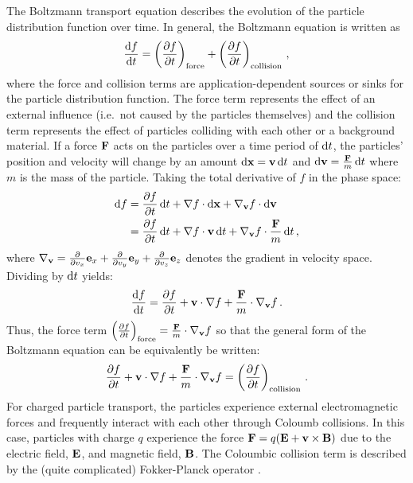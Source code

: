 \documentclass[../doc.tex]{subfiles}
\begin{document}
The Boltzmann transport equation describes the evolution of the particle distribution function over time. In general, the Boltzmann equation is written as 
	\begin{equation}
		\frac{\mathop{}\!\mathrm{d} f}{\mathop{}\!\mathrm{d} t} = \left( \frac{\partial f}{\partial t} \right)_\text{force} + \left( \frac{\partial f}{\partial t} \right)_\text{collision} \,,
	\end{equation}
where the force and collision terms are application-dependent sources or sinks for the particle distribution function. The force term represents the effect of an external influence (i.e.~not caused by the particles themselves) and the collision term represents the effect of particles colliding with each other or a background material. If a force $\boldsymbol{\mathrm{F}}$ acts on the particles over a time period of $\mathop{}\!\mathrm{d} t$, the particles' position and velocity will change by an amount $\mathop{}\!\mathrm{d} \boldsymbol{\mathrm{x}} = \boldsymbol{\mathrm{v}}\mathop{}\!\mathrm{d} t$ and $\mathop{}\!\mathrm{d} \boldsymbol{\mathrm{v}} = \frac{\boldsymbol{\mathrm{F}}}{m} \mathop{}\!\mathrm{d} t$ where $m$ is the mass of the particle. Taking the total derivative of $f$ in the phase space: 
	\begin{equation}
	\begin{aligned}
		\mathop{}\!\mathrm{d} f &= \frac{\partial f}{\partial t} \mathop{}\!\mathrm{d} t + \nabla f \cdot\mathop{}\!\mathrm{d} \boldsymbol{\mathrm{x}} + \nabla_{\boldsymbol{\mathrm{v}}} f \cdot\mathop{}\!\mathrm{d} \boldsymbol{\mathrm{v}} \\
		&= \frac{\partial f}{\partial t} \mathop{}\!\mathrm{d} t + \nabla f \cdot\boldsymbol{\mathrm{v}} \mathop{}\!\mathrm{d} t + \nabla_{\boldsymbol{\mathrm{v}}}f \cdot\frac{\boldsymbol{\mathrm{F}}}{m} \mathop{}\!\mathrm{d} t \,, 
	\end{aligned}
	\end{equation}
where $\nabla_{\boldsymbol{\mathrm{v}}} = \frac{\partial }{\partial v_x} \boldsymbol{\mathrm{e}}_x + \frac{\partial }{\partial v_y}\boldsymbol{\mathrm{e}}_y + \frac{\partial }{\partial v_z} \boldsymbol{\mathrm{e}}_z$ denotes the gradient in velocity space. 
Dividing by $\mathop{}\!\mathrm{d} t$ yields: 
	\begin{equation}
		\frac{\mathop{}\!\mathrm{d} f}{\mathop{}\!\mathrm{d} t} = \frac{\partial f}{\partial t} + \boldsymbol{\mathrm{v}} \cdot \nabla f + \frac{\boldsymbol{\mathrm{F}}}{m} \cdot \nabla_{\boldsymbol{\mathrm{v}}} f \,. 
	\end{equation}
Thus, the force term $\left( \frac{\partial f}{\partial t} \right)_\text{force} = \frac{\boldsymbol{\mathrm{F}}}{m}\cdot\nabla_{\boldsymbol{\mathrm{v}}} f$ so that the general form of the Boltzmann equation can be equivalently be written: 
	\begin{equation}
		\frac{\partial f}{\partial t} + \boldsymbol{\mathrm{v}} \cdot \nabla f + \frac{\boldsymbol{\mathrm{F}}}{m} \cdot \nabla_{\boldsymbol{\mathrm{v}}} f = \left( \frac{\partial f}{\partial t} \right)_\text{collision} \,. 
	\end{equation}
For charged particle transport, the particles experience external electromagnetic forces and frequently interact with each other through Coloumb collisions. In this case, particles with charge $q$ experience the force $\boldsymbol{\mathrm{F}} = q(\boldsymbol{\mathrm{E}} + \boldsymbol{\mathrm{v}}\times \boldsymbol{\mathrm{B}})$ due to the electric field, $\boldsymbol{\mathrm{E}}$, and magnetic field, $\boldsymbol{\mathrm{B}}$. The Coloumbic collision term is described by the (quite complicated) Fokker-Planck operator \cite[Eq.~7.25]{chen2012introduction}. 
\end{document}
